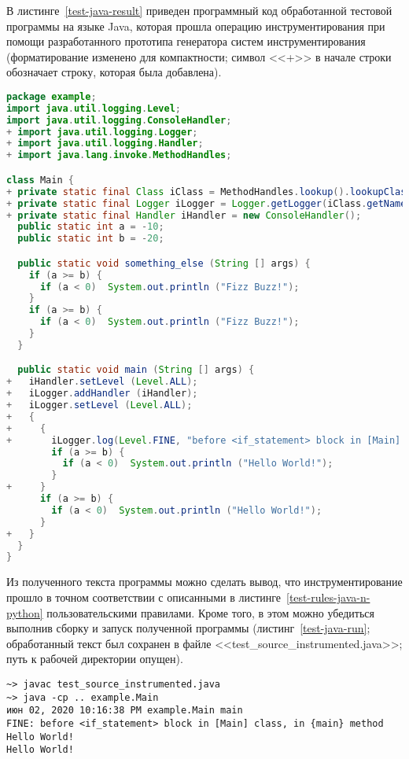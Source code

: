 В листинге~\ref{test-java-result} приведен программный код обработанной тестовой программы на языке Java, которая прошла операцию инструментирования при помощи разработанного прототипа генератора систем инструментирования (форматирование изменено для компактности; символ <<+>> в начале строки обозначает строку, которая была добавлена).

\begin{lstlisting}[frame=single, language=Java, label={test-java-result}, caption={Текст инструментированного тестового приложения.}]
package example;
import java.util.logging.Level;
import java.util.logging.ConsoleHandler;
+ import java.util.logging.Logger;
+ import java.util.logging.Handler;
+ import java.lang.invoke.MethodHandles;

class Main {
+ private static final Class iClass = MethodHandles.lookup().lookupClass();
+ private static final Logger iLogger = Logger.getLogger(iClass.getName());
+ private static final Handler iHandler = new ConsoleHandler();
  public static int a = -10;
  public static int b = -20;

  public static void something_else (String [] args) {
    if (a >= b) {
      if (a < 0)  System.out.println ("Fizz Buzz!");
    }
    if (a >= b) {
      if (a < 0)  System.out.println ("Fizz Buzz!");
    }
  }

  public static void main (String [] args) {
+   iHandler.setLevel (Level.ALL);
+   iLogger.addHandler (iHandler);
+   iLogger.setLevel (Level.ALL);
+   {
+     {
+       iLogger.log(Level.FINE, "before <if_statement> block in [Main] class, in {main} method");
        if (a >= b) {
          if (a < 0)  System.out.println ("Hello World!");
        }
+     }
      if (a >= b) {
        if (a < 0)  System.out.println ("Hello World!");
      }
+   }
  }
}
\end{lstlisting}

Из полученного текста программы можно сделать вывод, что инструментирование прошло в точном соответствии с описанными в листинге~\ref{test-rules-java-n-python} пользовательскими правилами.
Кроме того, в этом можно убедиться выполнив сборку и запуск полученной программы (листинг~\ref{test-java-run}; обработанный текст был сохранен в файле <<test\_source\_instrumented.java>>; путь к рабочей директории опущен).

\begin{lstlisting}[frame=single, label={test-java-run}, caption={Результаты сборки и запуска обработанного тестового приложения.}]
~> javac test_source_instrumented.java
~> java -cp .. example.Main
июн 02, 2020 10:16:38 PM example.Main main
FINE: before <if_statement> block in [Main] class, in {main} method
Hello World!
Hello World!
\end{lstlisting}

